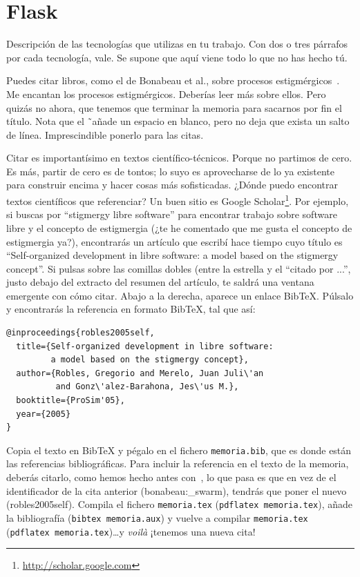 \documentclass[a4paper, 12pt]{book}
\begin{document}
\section{Flask} 
\label{sec:flask}


Descripción de las tecnologías que utilizas en tu trabajo. 
Con dos o tres párrafos por cada tecnología, vale. 
Se supone que aquí viene todo lo que no has hecho tú.

Puedes citar libros, como el de Bonabeau et al., sobre procesos estigmérgicos~\cite{bonabeau:_swarm}. 
Me encantan los procesos estigmérgicos.
Deberías leer más sobre ellos.
Pero quizás no ahora, que tenemos que terminar la memoria para sacarnos por fin el título.
Nota que el \~ \ añade un espacio en blanco, pero no deja que exista un salto de línea. 
Imprescindible ponerlo para las citas.

Citar es importantísimo en textos científico-técnicos. 
Porque no partimos de cero.
Es más, partir de cero es de tontos; lo suyo es aprovecharse de lo ya existente para construir encima y hacer cosas más sofisticadas.
¿Dónde puedo encontrar textos científicos que referenciar?
Un buen sitio es Google Scholar\footnote{\url{http://scholar.google.com}}.
Por ejemplo, si buscas por ``stigmergy libre software'' para encontrar trabajo sobre software libre y el concepto de estigmergia (¿te he comentado que me gusta el concepto de estigmergia ya?), encontrarás un artículo que escribí hace tiempo cuyo título es ``Self-organized development in libre software: a model based on the stigmergy concept''.
Si pulsas sobre las comillas dobles (entre la estrella y el ``citado por ...'', justo debajo del extracto del resumen del artículo, te saldrá una ventana emergente con cómo citar.
Abajo a la derecha, aparece un enlace BibTeX.
Púlsalo y encontrarás la referencia en formato BibTeX, tal que así:

{\footnotesize
\begin{verbatim}
@inproceedings{robles2005self,
  title={Self-organized development in libre software:
         a model based on the stigmergy concept},
  author={Robles, Gregorio and Merelo, Juan Juli\'an 
          and Gonz\'alez-Barahona, Jes\'us M.},
  booktitle={ProSim'05},
  year={2005}
}
\end{verbatim}
}

Copia el texto en BibTeX y pégalo en el fichero \texttt{memoria.bib}, que es donde están las referencias bibliográficas.
Para incluir la referencia en el texto de la memoria, deberás citarlo, como hemos hecho antes con~\cite{bonabeau:_swarm}, lo que pasa es que en vez de el identificador de la cita anterior (bonabeau:\_swarm), tendrás que poner el nuevo (robles2005self).
Compila el fichero \texttt{memoria.tex} (\texttt{pdflatex memoria.tex}), añade la bibliografía (\texttt{bibtex memoria.aux}) y vuelve a compilar \texttt{memoria.tex} (\texttt{pdflatex memoria.tex})\ldots y \emph{voilà} ¡tenemos una nueva cita!
\end{document}
